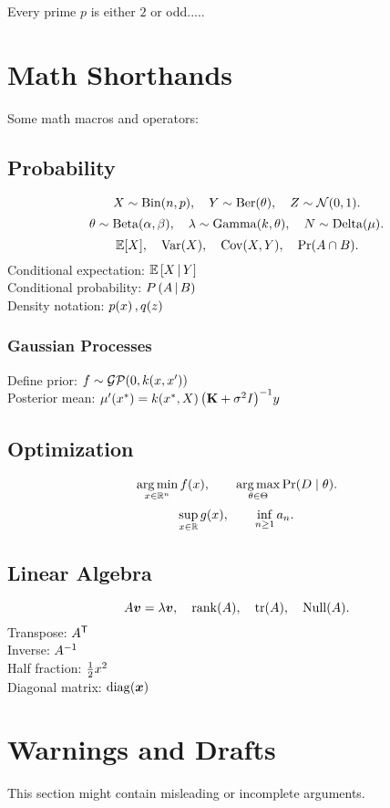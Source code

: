 \documentclass[11pt]{article}
\begin{document}
\begin{corollary}
Every prime $p$ is either $2$ or odd.....
\end{corollary}

\section{Math Shorthands}
Some math macros and operators:

\subsection{Probability}
\[
X \sim \operatorname{Bin}(n,p), \quad Y \sim \operatorname{Ber}(\theta), \quad Z \sim \mathcal{N}(0,1).
\]
\[
\theta \sim \operatorname{Beta}(\alpha,\beta), \quad 
\lambda \sim \operatorname{Gamma}(k,\theta), \quad 
N \sim \operatorname{Delta}(\mu).
\]
\[
\mathbb{E}[X], \quad \operatorname{Var}(X), \quad \operatorname{Cov}(X,Y), \quad \Pr(A \cap B).
\]
Conditional expectation: $\mathbb{E}\left[X \,\middle|\, Y\right]$ \\
Conditional probability: $P\left(A \,\middle|\, B\right)$ \\
Density notation: $p\!\left(x\right), q\!\left(z\right)$

\subsubsection{Gaussian Processes}
Define prior: $f \sim \mathcal{GP}\!\left(0, k(x,x')\right)$ \\
Posterior mean: $\mu'(x^*) = k\!\left(x^*,X\right) \big(\mathbf{K} + \sigma^2 I\big)^{-1} y$


\subsection{Optimization}
\[
\operatorname*{arg\,min}_{x \in \mathbb{R}^n} f(x), 
\qquad 
\operatorname*{arg\,max}_{\theta \in \Theta} \Pr(D \mid \theta).
\]
\[
\sup_{x \in \mathbb{R}} g(x), 
\qquad 
\inf_{n \geq 1} a_n.
\]

\subsection{Linear Algebra}
\[
A \bm{v} = \lambda \bm{v}, 
\quad \operatorname{rank}(A), 
\quad \operatorname{tr}(A), 
\quad \operatorname{Null}(A).
\]
Transpose: $A^{\mathsf{T}}$ \\
Inverse: $A^{-1}$ \\
Half fraction: $\tfrac{1}{2} x^2$ \\
Diagonal matrix: $\operatorname{diag}(\bm{x})$


\section{Warnings and Drafts}
\begin{danger}
This section might contain misleading or incomplete arguments.
\end{danger}
\end{document}
